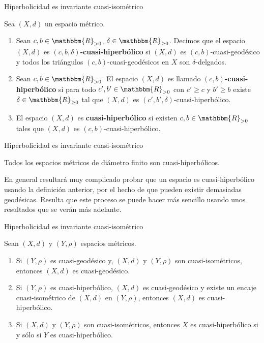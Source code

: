 \documentclass[xcolor=dvipsnames]{beamer}
\theoremstyle{largebreak}
\newcommand{\bbm}[1]{\ensuremath{\mathbbm{#1}}}
\begin{document}
\begin{frame}{Hiperbolicidad es invariante cuasi-isométrico}
    \begin{mydef}
        Sea $(X,d)$ un espacio métrico.
        \begin{enumerate}[label = \textit{(\arabic*)}]
            \item Sean $c,b\in\bbm{R}_{>0}$, $\delta\in\bbm{R}_{\geq0}$. Decimos que el espacio $(X,d)$ es \textbf{$(c,b,\delta)$-cuasi-hiperbólico} si $(X,d)$ es $(c,b)$-cuasi-geodésico y todos los triángulos $(c,b)$-cuasi-geodésicos en $X$ son $\delta$-delgados.
            \item Sean $c,b\in\bbm{R}_{>0}$. El espacio $(X,d)$ es llamado \textbf{$(c,b)$-cuasi-hiperbólico} si para todo $c',b'\in\bbm{R}_{>0}$ con $c'\geq c$ y $b'\geq b$ existe $\delta\in\bbm{R}_{\geq0}$ tal que $(X,d)$ es $(c',b',\delta)$-cuasi-hiperbólico.
            \item El espacio $(X,d)$ es \textbf{cuasi-hiperbólico} si existen $c,b\in\bbm{R}_{>0}$ tales que $(X,d)$ es $(c,b)$-cuasi-hiperbólico.
        \end{enumerate}
    \end{mydef}
\end{frame}

\begin{frame}{Hiperbolicidad es invariante cuasi-isométrico}
    \begin{exa}
        Todos los espacios métricos de diámetro finito son cuasi-hiperbólicos.
    \end{exa}

    \begin{obs}
        En general resultará muy complicado probar que un espacio es cuasi-hiperbólico usando la definición anterior, por el hecho de que pueden existir demasiadas geodésicas. Resulta que este proceso se puede hacer más sencillo usando unos resultados que se verán más adelante.
    \end{obs}
\end{frame}

\begin{frame}{Hiperbolicidad es invariante cuasi-isométrico}
    \begin{propo}
        Sean $(X,d)$ y $(Y,\rho)$ espacios métricos.
        \begin{enumerate}[label = \textit{(\arabic*)}]
            \item Si $(Y,\rho)$ es cuasi-geodésico y, $(X,d)$ y $(Y,\rho)$ son cuasi-isométricos, entonces $(X,d)$ es cuasi-geodésico.
            \item Si $(Y,\rho)$ es cuasi-hiperbólico, $(X,d)$ es cuasi-geodésico y existe un encaje cuasi-isométrico de $(X,d)$ en $(Y,\rho)$, entonces $(X,d)$ es cuasi-hiperbólico.
            \item Si $(X,d)$ y $(Y,\rho)$ son cuasi-isométricos, entonces $X$ es cuasi-hiperbólico si y sólo si $Y$ es cuasi-hiperbólico.
        \end{enumerate}
    \end{propo}
\end{frame}
\end{document}
